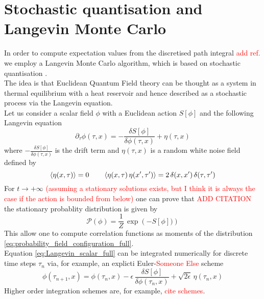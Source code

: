 \section{Stochastic quantisation and Langevin Monte Carlo}
In order to compute expectation values from the discretised path integral \textcolor{red}{add ref.} we employ a Langevin Monte Carlo algorithm, which is based on stochastic quantisation \cite{ParisiWu, Damgaard1987StochasticQuantization}. \\
The idea is that Euclidean Quantum Field theory can be thought as a system in thermal equilibrium with a heat reservoir and hence described as a stochastic process via the Langevin equation. \\
Let us consider a scalar field $\phi$ with a Euclidean action $S[\phi]$ and the following Langevin equation
\begin{equation}
    \partial_\tau \phi(\tau, x) = - \frac{\delta S[\phi]}{\delta \phi (\tau, x)} + \eta (\tau, x)
    \label{eq:Langevin_scalar_full}
\end{equation}
where $- \frac{\delta S[\phi]}{\delta \phi (\tau, x)}$ is the drift term and $\eta (\tau, x)$ is a random white noise field defined by
\begin{equation*}
    \left\langle \eta(x,\tau) \right\rangle = 0 \qquad \left\langle \eta(x,\tau) \, \eta(x',\tau') \right\rangle = 2 \, \delta(x, x') \, \delta (\tau, \tau')
\end{equation*}
For $t \to +\infty$ \textcolor{red}{(assuming a stationary solutions exists, but I think it is always the case if the action is bounded from below)} one can prove that \textcolor{red}{ADD CITATION} the stationary probablity distribution is given by
\begin{equation}
    \mathcal{P}(\phi) = \frac{1}{Z} \, \exp\left(-S[\phi])\right)
    \label{eq:probability_field_configuration_full}
\end{equation}
This allow one to compute correlation functions as moments of the distribution \eqref{eq:probability_field_configuration_full}. \\
Equation \ref{eq:Langevin_scalar_full} can be integrated numerically for discrete time steps $\tau_n$ via, for example, an explicti Euler-\textcolor{red}{Someone Else} scheme
\begin{equation*}
    \phi(\tau_{n+1}, x) = \phi(\tau_{n}, x) - \epsilon \,  \frac{\delta S[\phi]}{\delta \phi (\tau_n, x)} + \sqrt{2\epsilon} \, \eta(\tau_n, x)
\end{equation*}
Higher order integration schemes are, for example, \textcolor{red}{cite schemes}.
